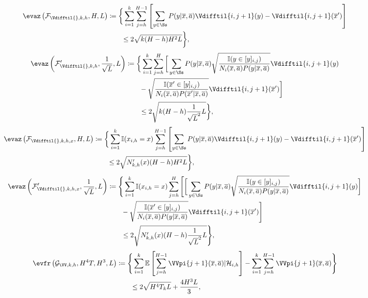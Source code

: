 \begin{align*}
    \evaz\left( \mathcal{F}_{\Vdifftil{}, k, h}, H, L \right) &\coloneqq \bigg\{\sum_{i=1}^k \sum_{j=h}^{H-1} \left[ \sum_{y\in\Ss} P(y|\overline{x},\overline{a})\Vdifftil{i,j+1}(y) - \Vdifftil{i,j+1}(\overline{x}') \right] \\
    &\qquad \le 2 \sqrt{k (H-h) H^2 L} \bigg\},
\end{align*}
\begin{align*}
    \evaz\left( \mathcal{F}'_{\Vdifftil{}, k, h}, \frac{1}{\sqrt{L}}, L \right) &\coloneqq \bigg\{ \sum_{i=1}^k \sum_{j=h}^H \bigg[\sum_{y\in\Ss} P(y|\overline{x}, \overline{a}) \sqrt{\frac{\mathbb{I}(y \in [y]_{i,j})}{N_i(\overline{x}, \overline{a})P(y|\overline{x}, \overline{a})}} \Vdifftil{i,j+1}(y) \\
    &\qquad - \sqrt{\frac{\mathbb{I}(\overline{x}' \in [y]_{i,j})}{N_i(\overline{x}, \overline{a})P(\overline{x}'|\overline{x}, \overline{a})}} \Vdifftil{i,j+1}(\overline{x}') \bigg] \\
    &\qquad \le 2 \sqrt{k(H-h) \frac{1}{\sqrt{L}^2} L}\bigg\},
\end{align*}
\begin{align*}
    \evaz\left( \mathcal{F}_{\Vdifftil{}, k, h, x}, H, L \right) &\coloneqq \bigg\{\sum_{i=1}^k \mathbb{I}(x_{i,h}=x) \sum_{j=h}^{H-1} \left[ \sum_{y\in\Ss} P(y|\overline{x}, \overline{a})\Vdifftil{i,j+1}(y) - \Vdifftil{i,j+1}(\overline{x}') \right] \\
    &\qquad \le 2 \sqrt{N'_{k,h}(x) (H-h) H^2 L} \bigg\},
\end{align*}
\begin{align*}
    \evaz\left( \mathcal{F}'_{\Vdifftil{}, k, h, x}, \frac{1}{\sqrt{L}}, L \right) &\coloneqq \Bigg\{ \sum_{i=1}^k \mathbb{I}(x_{i,h}=x) \sum_{j=h}^H \Bigg[ \bigg[\sum_{y\in\Ss} P(y|\overline{x}, \overline{a}) \sqrt{\frac{\mathbb{I}(y \in [y]_{i,j})}{N_i(\overline{x}, \overline{a})P(y|\overline{x}, \overline{a})}} \Vdifftil{i,j+1}(y) \bigg] \\
    &\qquad - \sqrt{\frac{\mathbb{I}(\overline{x}' \in [y]_{i,j})}{N_i(\overline{x}, \overline{a})P(y|\overline{x}, \overline{a})}} \Vdifftil{i,j+1}(\overline{x}') \Bigg] \\
    &\qquad \le 2 \sqrt{N'_{k,h}(x) (H-h) \frac{1}{\sqrt{L}^2} L}\Bigg\}, \\
\end{align*}
\begin{align*}
    \evfr\left( \mathcal{G}_{\VV, k, h}, H^4T, H^3, L \right) & \coloneqq \Bigg\{ \sum_{i=1}^k \mathbb{E} \left[ \sum_{j=h}^{H-1} \VVpi{j+1} (\overline{x}, \overline{a}) | \mathcal{H}_{i,h} \right] - \sum_{i=1}^k \sum_{j=h}^{H-1} \VVpi{j+1} (\overline{x}, \overline{a}) \Bigg\} \\
    &\qquad \le 2\sqrt{H^4 T_k L} + \frac{4H^3 L}{3},\\
\end{align*}
